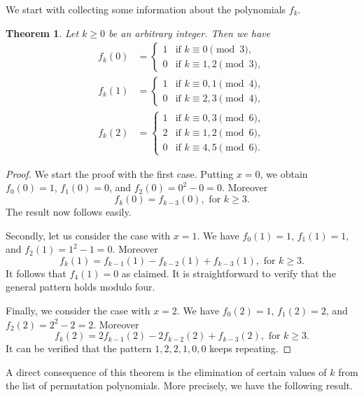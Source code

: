 \documentclass{amsart}
\numberwithin{equation}{section}
\theoremstyle{plain}
\newtheorem{theorem}{Theorem}
\theoremstyle{definition}
\begin{document}
We start with collecting some information about the polynomials $f_k$.

\begin{theorem}\label{thm:A2output012} Let $k\ge 0$ be an arbitrary integer. Then we have
	\begin{align*}
		f_k(0) &= 
		\begin{cases} 
			1 & \text{if } k \equiv 0\pmod3, \\
			0 & \text{if } k \equiv 1,2\pmod3,
		\end{cases}\\
		f_k(1) &= 
		\begin{cases} 
			1 & \text{if } k \equiv 0,1\pmod4, \\
			0 & \text{if } k \equiv 2,3\pmod4,
		\end{cases}\\
		f_k(2) &= 
		\begin{cases} 
			1 & \text{if } k \equiv 0,3\pmod6, \\
			2 & \text{if } k \equiv 1,2\pmod6, \\
			0 & \text{if } k \equiv 4,5\pmod6.
		\end{cases}
	\end{align*}
\end{theorem}
\begin{proof}
We start the proof with the first case. Putting $x=0$, we obtain $f_0(0)=1$, $f_1(0)=0$, and $f_2(0)=0^2-0=0$. Moreover
$$f_k(0)=f_{k-3}(0), \text{ for }k\ge3.$$
The result now follows easily. 

Secondly, let us consider the case with $x=1$. We have $f_0(1)=1$, $f_1(1)=1$, and $f_2(1)=1^2-1=0$. Moreover
$$f_k(1)=f_{k-1}(1)-f_{k-2}(1)+f_{k-3}(1), \text{ for }k\ge3.$$
It follows that $f_4(1)=0$ as claimed. It is straightforward to verify that the general pattern holds modulo four. 

Finally, we consider the case with $x=2$.  We have $f_0(2)=1$, $f_1(2)=2$, and $f_2(2)=2^2-2=2$. Moreover
$$f_k(2)=2f_{k-1}(2)-2f_{k-2}(2)+f_{k-3}(2), \text{ for }k\ge3.$$
It can be verified that the pattern $1,2,2,1,0,0$ keeps repeating.
\end{proof}

A direct consequence of this theorem is the elimination of certain values of $k$ from the list of permutation polynomials. More precisely, we have the following result.
\end{document}
